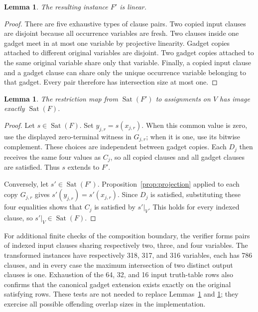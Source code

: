 \documentclass[11pt]{article}
\newtheorem{lemma}[theorem]{Lemma}
\theoremstyle{definition}
\newcommand{\Sat}{\operatorname{Sat}}
\begin{document}
\begin{lemma}\label{lem:linear}
The resulting instance $F'$ is linear.
\end{lemma}

\begin{proof}
There are five exhaustive types of clause pairs.  Two copied input clauses
are disjoint because all occurrence variables are fresh.  Two clauses inside
one gadget meet in at most one variable by projective linearity.  Gadget
copies attached to different original variables are disjoint.  Two gadget
copies attached to the same original variable share only that variable.
Finally, a copied input clause and a gadget clause can share only the unique
occurrence variable belonging to that gadget.  Every pair therefore has
intersection size at most one.
\end{proof}

\begin{lemma}\label{lem:projection}
The restriction map from $\Sat(F')$ to assignments on $V$ has image exactly
$\Sat(F)$.
\end{lemma}

\begin{proof}
Let $s\in\Sat(F)$.  Set $y_{j,r}=s(x_{j,r})$.  When this common value is zero,
use the displayed zero-terminal witness in $G_{j,r}$; when it is one, use its
bitwise complement.  These choices are independent between gadget copies.
Each $D_j$ then receives the same four values as $C_j$, so all copied clauses
and all gadget clauses are satisfied.  Thus $s$ extends to $F'$.

Conversely, let $s'\in\Sat(F')$.  Proposition~\ref{prop:projection} applied to
each copy $G_{j,r}$ gives
$s'(y_{j,r})=s'(x_{j,r})$.  Since $D_j$ is satisfied, substituting these four
equalities shows that $C_j$ is satisfied by $s'|_V$.  This holds for every
indexed clause, so $s'|_V\in\Sat(F)$.
\end{proof}

For additional finite checks of the composition boundary, the verifier forms
pairs of indexed input clauses sharing respectively two, three, and four
variables.  The transformed instances have respectively 318, 317, and 316
variables, each has 786 clauses, and in every case the maximum intersection
of two distinct output clauses is one.  Exhaustion of the 64, 32, and 16
input truth-table rows also confirms that the canonical gadget extension
exists exactly on the original satisfying rows.  These tests are not needed
to replace Lemmas~\ref{lem:linear} and \ref{lem:projection}; they exercise all
possible offending overlap sizes in the implementation.
\end{document}
